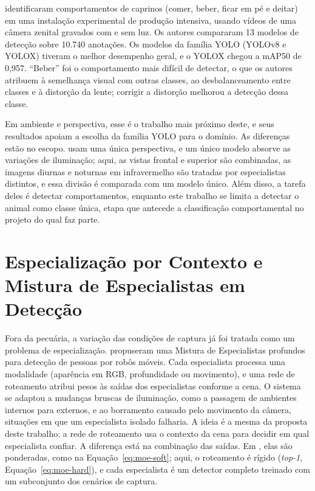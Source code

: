  identificaram comportamentos de caprinos (comer, beber, ficar em pé e deitar) em uma instalação experimental de produção intensiva, usando vídeos de uma câmera zenital gravados com e sem luz. Os autores compararam 13 modelos de detecção sobre 10.740 anotações. Os modelos da família YOLO (YOLOv8 e YOLOX) tiveram o melhor desempenho geral, e o YOLOX chegou a mAP50 de 0,957. ``Beber'' foi o comportamento mais difícil de detectar, o que os autores atribuem à semelhança visual com outras classes, ao desbalanceamento entre classes e à distorção da lente; corrigir a distorção melhorou a detecção dessa classe.

Em ambiente e perspectiva, esse é o trabalho mais próximo deste, e seus resultados apoiam a escolha da família YOLO para o domínio. As diferenças estão no escopo.  usam uma única perspectiva, e um único modelo absorve as variações de iluminação; aqui, as vistas frontal e superior são combinadas, as imagens diurnas e noturnas em infravermelho são tratadas por especialistas distintos, e essa divisão é comparada com um modelo único. Além disso, a tarefa deles é detectar comportamentos, enquanto este trabalho se limita a detectar o animal como classe única, etapa que antecede a classificação comportamental no projeto do qual faz parte.

\section{Especialização por Contexto e Mistura de Especialistas em Detecção}
\label{sec:especializacao-contexto}

Fora da pecuária, a variação das condições de captura já foi tratada como um problema de especialização.  propuseram uma Mistura de Especialistas profundos para detecção de pessoas por robôs móveis. Cada especialista processa uma modalidade (aparência em RGB, profundidade ou movimento), e uma rede de roteamento atribui pesos às saídas dos especialistas conforme a cena. O sistema se adaptou a mudanças bruscas de iluminação, como a passagem de ambientes internos para externos, e ao borramento causado pelo movimento da câmera, situações em que um especialista isolado falharia. A ideia é a mesma da proposta deste trabalho: a rede de roteamento usa o contexto da cena para decidir em qual especialista confiar. A diferença está na combinação das saídas. Em , elas são ponderadas, como na Equação~\ref{eq:moe-soft}; aqui, o roteamento é rígido (\textit{top-1}, Equação~\ref{eq:moe-hard}), e cada especialista é um detector completo treinado com um subconjunto dos cenários de captura.

